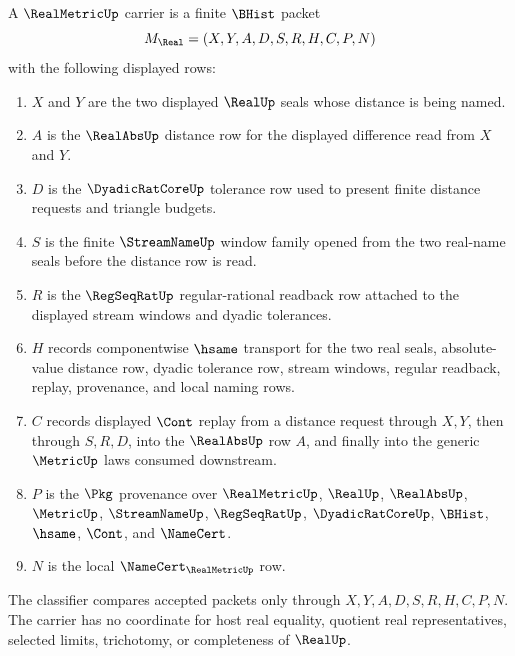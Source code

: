 \begin{definition}
\label{def:real-metric-carrier}
A $\RealMetricUp$ carrier is a finite $\BHist$ packet
$$
M_{\Real}=(X,Y,A,D,S,R,H,C,P,N)
$$
with the following displayed rows:
\begin{enumerate}
\item $X$ and $Y$ are the two displayed $\RealUp$ seals whose distance is being named.
\item $A$ is the $\RealAbsUp$ distance row for the displayed difference read from $X$ and $Y$.
\item $D$ is the $\DyadicRatCoreUp$ tolerance row used to present finite distance requests and triangle budgets.
\item $S$ is the finite $\StreamNameUp$ window family opened from the two real-name seals before the distance row is read.
\item $R$ is the $\RegSeqRatUp$ regular-rational readback row attached to the displayed stream windows and dyadic tolerances.
\item $H$ records componentwise $\hsame$ transport for the two real seals, absolute-value distance row, dyadic tolerance row, stream windows, regular readback, replay, provenance, and local naming rows.
\item $C$ records displayed $\Cont$ replay from a distance request through $X,Y$, then through $S,R,D$, into the $\RealAbsUp$ row $A$, and finally into the generic $\MetricUp$ laws consumed downstream.
\item $P$ is the $\Pkg$ provenance over $\RealMetricUp$, $\RealUp$, $\RealAbsUp$, $\MetricUp$, $\StreamNameUp$, $\RegSeqRatUp$, $\DyadicRatCoreUp$, $\BHist$, $\hsame$, $\Cont$, and $\NameCert$.
\item $N$ is the local $\NameCert_{\RealMetricUp}$ row.
\end{enumerate}
The classifier compares accepted packets only through $X,Y,A,D,S,R,H,C,P,N$. The carrier has no coordinate for host real equality, quotient real representatives, selected limits, trichotomy, or completeness of $\RealUp$.
\end{definition}

